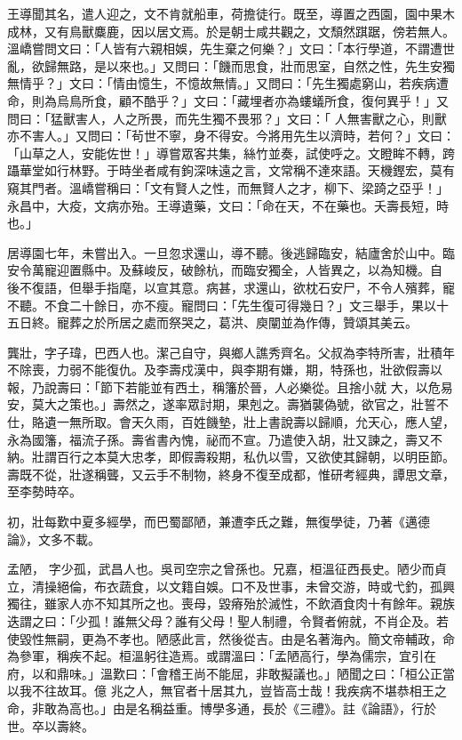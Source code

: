 \begin{pinyinscope}
 王導聞其名，遣人迎之，文不肯就船車，荷擔徒行。既至，導置之西園，園中果木成林，又有鳥獸麋鹿，因以居文焉。於是朝士咸共觀之，文頹然踑踞，傍若無人。溫嶠嘗問文曰：「人皆有六親相娛，先生棄之何樂？」文曰：「本行學道，不謂遭世亂，欲歸無路，是以來也。」又問曰：「饑而思食，壯而思室，自然之性，先生安獨無情乎？」文曰：「情由憶生，不憶故無情。」又問曰：「先生獨處窮山，若疾病遭命，則為烏鳥所食，顧不酷乎？」文曰：「藏埋者亦為螻蟻所食，復何異乎！」又問曰：「猛獸害人，人之所畏，而先生獨不畏邪？」文曰：「
 人無害獸之心，則獸亦不害人。」又問曰：「茍世不寧，身不得安。今將用先生以濟時，若何？」文曰：「山草之人，安能佐世！」導嘗眾客共集，絲竹並奏，試使呼之。文瞪眸不轉，跨躡華堂如行林野。于時坐者咸有鉤深味遠之言，文常稱不達來語。天機鏗宏，莫有窺其門者。溫嶠嘗稱曰：「文有賢人之性，而無賢人之才，柳下、梁踦之亞乎！」永昌中，大疫，文病亦殆。王導遺藥，文曰：「命在天，不在藥也。夭壽長短，時也。」



 居導園七年，未嘗出入。一旦忽求還山，導不聽。後逃歸臨安，結廬舍於山中。臨安令萬寵迎置縣中。及蘇峻反，破餘杭，而臨安獨全，人皆異之，以為知機。自
 後不復語，但舉手指麾，以宣其意。病甚，求還山，欲枕石安尸，不令人殯葬，寵不聽。不食二十餘日，亦不瘦。寵問曰：「先生復可得幾日？」文三舉手，果以十五日終。寵葬之於所居之處而祭哭之，葛洪、庾闡並為作傳，贊頌其美云。



 龔壯，字子瑋，巴西人也。潔己自守，與鄉人譙秀齊名。父叔為李特所害，壯積年不除喪，力弱不能復仇。及李壽戍漢中，與李期有嫌，期，特孫也，壯欲假壽以報，乃說壽曰：「節下若能並有西土，稱籓於晉，人必樂從。且捨小就
 大，以危易安，莫大之策也。」壽然之，遂率眾討期，果剋之。壽猶襲偽號，欲官之，壯誓不仕，賂遺一無所取。會天久雨，百姓饑墊，壯上書說壽以歸順，允天心，應人望，永為國籓，福流子孫。壽省書內愧，祕而不宣。乃遣使入胡，壯又諫之，壽又不納。壯謂百行之本莫大忠孝，即假壽殺期，私仇以雪，又欲使其歸朝，以明臣節。壽既不從，壯遂稱聾，又云手不制物，終身不復至成都，惟研考經典，譚思文章，至李勢時卒。



 初，壯每歎中夏多經學，而巴蜀鄙陋，兼遭李氏之難，無復學徒，乃著《邁德論》，文多不載。



 孟陋，
 字少孤，武昌人也。吳司空宗之曾孫也。兄嘉，桓溫征西長史。陋少而貞立，清操絕倫，布衣蔬食，以文籍自娛。口不及世事，未曾交游，時或弋釣，孤興獨往，雖家人亦不知其所之也。喪母，毀瘠殆於滅性，不飲酒食肉十有餘年。親族迭謂之曰：「少孤！誰無父母？誰有父母！聖人制禮，令賢者俯就，不肖企及。若使毀性無嗣，更為不孝也。陋感此言，然後從吉。由是名著海內。簡文帝輔政，命為參軍，稱疾不起。桓溫躬往造焉。或謂溫曰：「孟陋高行，學為儒宗，宜引在府，以和鼎味。」溫歎曰：「會稽王尚不能屈，非敢擬議也。」陋聞之曰：「桓公正當以我不往故耳。億
 兆之人，無官者十居其九，豈皆高士哉！我疾病不堪恭相王之命，非敢為高也。」由是名稱益重。博學多通，長於《三禮》。註《論語》，行於世。卒以壽終。




\end{pinyinscope}

